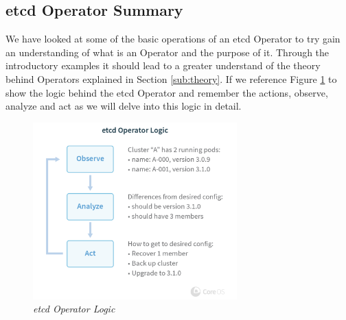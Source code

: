 \subsection{etcd Operator Summary}
We have looked at some of the basic operations of an etcd Operator to try gain an understanding of what is an Operator and the purpose of it. Through the introductory examples it should lead to a greater understand of the theory behind Operators explained in Section \ref{sub:theory}. If we reference Figure \ref{img:op_18} to show the logic behind the etcd Operator and remember the actions, observe, analyze and act as we will delve into this logic in detail.
\begin{figure}[!ht]
\centering
\includegraphics*[width=0.7\textwidth]{images/op918.png}
\caption{\em etcd Operator Logic}
\label{img:op_18}
\end{figure}

